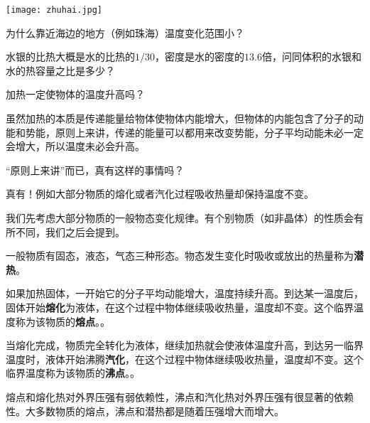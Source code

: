 \documentclass[CJK]{beamer}
\begin{document}
\begin{frame}
\bch
\bcenter
\texttt{[image: zhuhai.jpg]}
\ecenter

为什么靠近海边的地方（例如珠海）温度变化范围小？
\ech
\end{frame}

\begin{frame}
\bch
水银的比热大概是水的比热的$1/30$，密度是水的密度的$13.6$倍，问同体积的水银和水的热容量之比是多少？
\ech
\end{frame}

\begin{frame}
\bch
加热一定使物体的温度升高吗？
\ech
\end{frame}


\begin{frame}
\bch
\bitem
\item{虽然加热的本质是传递能量给物体使物体内能增大，但物体的内能包含了分子的动能和势能，原则上来讲，传递的能量可以都用来改变势能，分子平均动能未必一定会增大，所以温度未必会升高。}
\eitem

\skipline

“原则上来讲”而已，真有这样的事情吗？

\skipline

真有！例如大部分物质的熔化或者汽化过程吸收热量却保持温度不变。

\ech
\end{frame}


\begin{frame}
\bch
{\small 我们先考虑大部分物质的一般物态变化规律。有个别物质（如非晶体）的性质会有所不同，我们之后会提到。

\bitem
\item{一般物质有固态，液态，气态三种形态。物态发生变化时吸收或放出的热量称为{\bf 潜热}。}
\item{如果加热固体，一开始它的分子平均动能增大，温度持续升高。到达某一温度后，固体开始{\bf 熔化}为液体，在这个过程中物体继续吸收热量，温度却不变。这个临界温度称为该物质的{\bf 熔点}。{}。}
\item{当熔化完成，物质完全转化为液体，继续加热就会使液体温度升高，到达另一临界温度时，液体开始沸腾{\bf 汽化}，在这个过程中物体继续吸收热量，温度却不变。这个临界温度称为该物质的{\bf 沸点}。{}。}
\item{ 熔点和熔化热对外界压强有弱依赖性，沸点和汽化热对外界压强有很显著的依赖性。大多数物质的熔点，沸点和潜热都是随着压强增大而增大。}
\eitem}
\ech
\end{frame}
\end{document}
